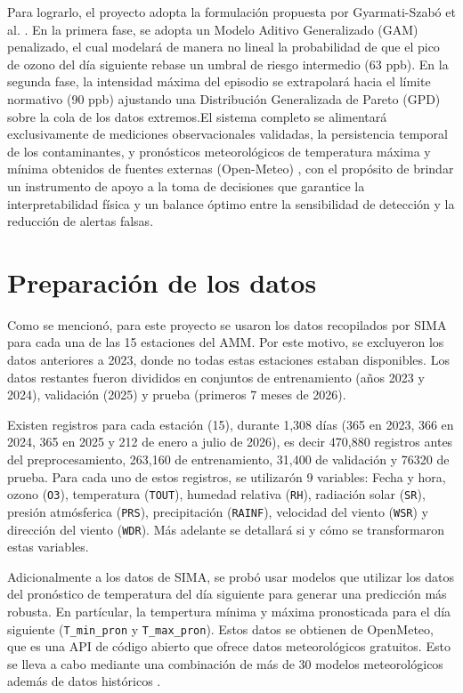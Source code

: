 \documentclass[11pt]{article}
\begin{document}
Para lograrlo, el proyecto adopta la formulación propuesta por Gyarmati-Szabó et al. \cite{gyarmati2017}. En la primera fase, se adopta un Modelo Aditivo Generalizado (GAM) penalizado, el cual modelará de manera no lineal la probabilidad de que el pico de ozono del día siguiente rebase un umbral de riesgo intermedio (63 ppb). En la segunda fase, la intensidad máxima del episodio se extrapolará hacia el límite normativo (90 ppb) ajustando una Distribución Generalizada de Pareto (GPD) sobre la cola de los datos extremos.El sistema completo se alimentará exclusivamente de mediciones observacionales validadas, la persistencia temporal de los contaminantes, y pronósticos meteorológicos de temperatura máxima y mínima obtenidos de fuentes externas (Open-Meteo) \cite{zippenfenig_open_meteo_2023}, con el propósito de brindar un instrumento de apoyo a la toma de decisiones que garantice la interpretabilidad física y un balance óptimo entre la sensibilidad de detección y la reducción de alertas falsas. 

\section{Preparación de los datos}


Como se mencionó, para este proyecto se usaron los datos recopilados por SIMA para cada una de las 15 estaciones del AMM. Por este motivo, se excluyeron los datos anteriores a 2023, donde no todas estas estaciones estaban disponibles. Los datos restantes fueron divididos en conjuntos de entrenamiento (años 2023 y 2024), validación (2025) y prueba (primeros 7 meses de 2026).

Existen registros para cada estación (15), durante 1,308 días (365 en 2023, 366 en 2024, 365 en 2025 y 212 de enero a julio de 2026), es decir 470,880 registros antes del preprocesamiento, 263,160 de entrenamiento, 31,400 de validación y 76320 de prueba. Para cada uno de estos registros, se utilizarón 9 variables: Fecha y hora, ozono (\texttt{O3}), temperatura (\texttt{TOUT}), humedad relativa (\texttt{RH}), radiación solar (\texttt{SR}), presión atmósferica (\texttt{PRS}), precipitación (\texttt{RAINF}), velocidad del viento (\texttt{WSR}) y dirección del viento (\texttt{WDR}). Más adelante se detallará si y cómo se transformaron estas variables.

Adicionalmente a los datos de SIMA, se probó usar modelos que utilizar los datos del pronóstico de temperatura del día siguiente para generar una predicción más robusta. En partícular, la tempertura mínima y máxima pronosticada para el día siguiente (\texttt{T\_min\_pron} y \texttt{T\_max\_pron}). Estos datos se obtienen de OpenMeteo, que es una API de código abierto que ofrece datos meteorológicos gratuitos. Esto se lleva a cabo mediante una combinación de más de 30 modelos meteorológicos además de datos históricos \citep{zippenfenig_open_meteo_2023}.
\end{document}
